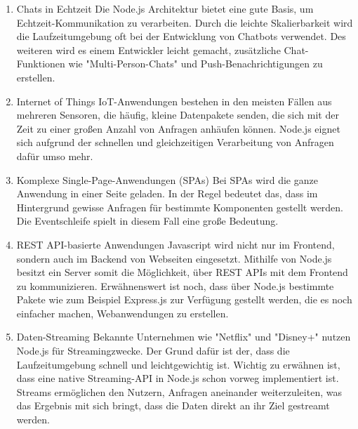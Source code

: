 \begin{enumerate}
    \item Chats in Echtzeit
    \newline Die Node.js Architektur bietet eine gute Basis, um Echtzeit-Kommunikation zu verarbeiten. Durch die leichte Skalierbarkeit wird die Laufzeitumgebung oft bei der Entwicklung von Chatbots verwendet. Des weiteren wird es einem Entwickler leicht gemacht, zusätzliche Chat-Funktionen wie "Multi-Person-Chats" und Push-Benachrichtigungen zu erstellen.\cite{Anwendungen}
    \item Internet of Things
    \newline
    IoT-Anwendungen bestehen in den meisten Fällen aus mehreren Sensoren, die häufig, kleine Datenpakete senden, die sich mit der Zeit zu einer großen Anzahl von Anfragen anhäufen können. Node.js eignet sich aufgrund der schnellen und gleichzeitigen Verarbeitung von Anfragen dafür umso mehr.\cite{Anwendungen}
    \item Komplexe Single-Page-Anwendungen (SPAs)
    \newline
    Bei SPAs wird die ganze Anwendung in einer Seite geladen. In der Regel bedeutet das, dass im Hintergrund gewisse Anfragen für bestimmte Komponenten gestellt werden. Die Eventschleife spielt in diesem Fall eine große Bedeutung.\cite{Anwendungen}
    \item REST API-basierte Anwendungen
    \newline
    Javascript wird nicht nur im Frontend, sondern auch im Backend von Webseiten eingesetzt. Mithilfe von Node.js besitzt ein Server somit die Möglichkeit, über REST APIs mit dem Frontend zu kommunizieren. Erwähnenswert ist noch, dass über Node.js bestimmte Pakete wie zum Beispiel Express.js zur Verfügung gestellt werden, die es noch einfacher machen, Webanwendungen zu erstellen.\cite{Anwendungen}
    \item Daten-Streaming
    \newline
    Bekannte Unternehmen wie "Netflix" und "Disney+" nutzen Node.js für Streamingzwecke. Der Grund dafür ist der, dass die Laufzeitumgebung schnell und leichtgewichtig ist. Wichtig zu erwähnen ist, dass eine native Streaming-API in Node.js schon vorweg implementiert ist. Streams ermöglichen den Nutzern, Anfragen aneinander weiterzuleiten, was das Ergebnis mit sich bringt, dass die Daten direkt an ihr Ziel gestreamt werden.\cite{Anwendungen}
    
\end{enumerate}




